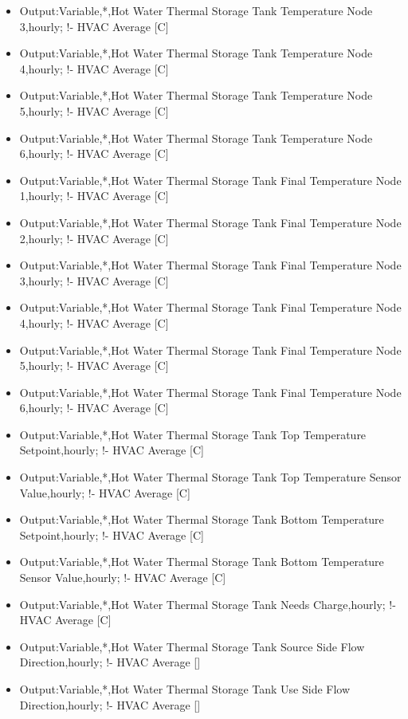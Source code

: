 \begin{itemize}
\item Output:Variable,*,Hot Water Thermal Storage Tank Temperature Node 3,hourly; !- HVAC Average {[}C{]}
\item Output:Variable,*,Hot Water Thermal Storage Tank Temperature Node 4,hourly; !- HVAC Average {[}C{]}
\item Output:Variable,*,Hot Water Thermal Storage Tank Temperature Node 5,hourly; !- HVAC Average {[}C{]}
\item Output:Variable,*,Hot Water Thermal Storage Tank Temperature Node 6,hourly; !- HVAC Average {[}C{]}
\item Output:Variable,*,Hot Water Thermal Storage Tank Final Temperature Node 1,hourly; !- HVAC Average {[}C{]}
\item Output:Variable,*,Hot Water Thermal Storage Tank Final Temperature Node 2,hourly; !- HVAC Average {[}C{]}
\item Output:Variable,*,Hot Water Thermal Storage Tank Final Temperature Node 3,hourly; !- HVAC Average {[}C{]}
\item Output:Variable,*,Hot Water Thermal Storage Tank Final Temperature Node 4,hourly; !- HVAC Average {[}C{]}
\item Output:Variable,*,Hot Water Thermal Storage Tank Final Temperature Node 5,hourly; !- HVAC Average {[}C{]}
\item Output:Variable,*,Hot Water Thermal Storage Tank Final Temperature Node 6,hourly; !- HVAC Average {[}C{]}
\item Output:Variable,*,Hot Water Thermal Storage Tank Top Temperature Setpoint,hourly; !- HVAC Average {[}C{]}
\item Output:Variable,*,Hot Water Thermal Storage Tank Top Temperature Sensor Value,hourly; !- HVAC Average {[}C{]}
\item Output:Variable,*,Hot Water Thermal Storage Tank Bottom Temperature Setpoint,hourly; !- HVAC Average {[}C{]}
\item Output:Variable,*,Hot Water Thermal Storage Tank Bottom Temperature Sensor Value,hourly; !- HVAC Average {[}C{]}
\item Output:Variable,*,Hot Water Thermal Storage Tank Needs Charge,hourly; !- HVAC Average {[}C{]}
\item Output:Variable,*,Hot Water Thermal Storage Tank Source Side Flow Direction,hourly; !- HVAC Average {[}{]}
\item Output:Variable,*,Hot Water Thermal Storage Tank Use Side Flow Direction,hourly; !- HVAC Average {[}{]}
\end{itemize}
